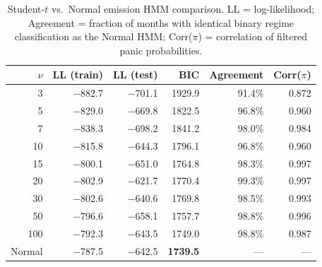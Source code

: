 \begin{table}[H]
\centering
\small
\begin{tabular}{r r r r r r}
\toprule
$\nu$ & LL (train) & LL (test) & BIC & Agreement & Corr($\pi$) \\
\midrule
3 & $-$882.7 & $-$701.1 & 1929.9 & 91.4\% & 0.872 \\
5 & $-$829.0 & $-$669.8 & 1822.5 & 96.8\% & 0.960 \\
7 & $-$838.3 & $-$698.2 & 1841.2 & 98.0\% & 0.984 \\
10 & $-$815.8 & $-$644.3 & 1796.1 & 96.8\% & 0.960 \\
15 & $-$800.1 & $-$651.0 & 1764.8 & 98.3\% & 0.997 \\
20 & $-$802.9 & $-$621.7 & 1770.4 & 99.3\% & 0.997 \\
30 & $-$802.6 & $-$640.6 & 1769.8 & 98.5\% & 0.993 \\
50 & $-$796.6 & $-$658.1 & 1757.7 & 98.8\% & 0.996 \\
100 & $-$792.3 & $-$643.5 & 1749.0 & 98.8\% & 0.987 \\
\midrule
Normal & $-$787.5 & $-$642.5 & \textbf{1739.5} & --- & --- \\
\bottomrule
\end{tabular}
\caption{Student-$t$ vs.\ Normal emission HMM comparison. LL = log-likelihood; Agreement = fraction of months with identical binary regime classification as the Normal HMM; Corr($\pi$) = correlation of filtered panic probabilities.}
\label{tab:student_t_hmm}
\end{table}
